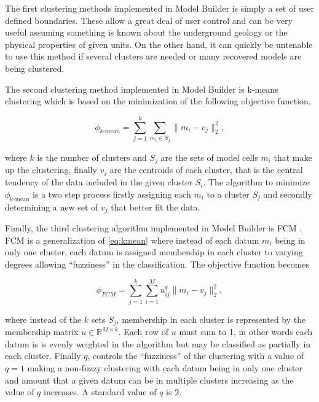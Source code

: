 The first clustering methods implemented in Model Builder is simply a set of user defined boundaries. These allow a great deal of user control and can be very useful assuming something is known about the underground geology or the physical properties of given units. On the other hand, it can quickly be untenable to use this method if several clusters are needed or many recovered models are being clustered.

The second clustering method implemented in Model Builder is k-means clustering \cite{gaf1984multivariate} which is based on the minimization of the following objective function,

\begin{equation}
 \phi_{k\text{-}mean} = \sum_{j=1}^k\sum_{m_i \in S_j}\|m_i - v_j\|_2^2, \label{eq:kmean}
\end{equation}


where $k$ is the number of clusters and $S_j$ are the sets of model cells $m_i$ that make up the clustering, finally $v_j$ are the centroids of each cluster, that is the central tendency of the data included in the given cluster $S_i$. The algorithm to minimize $\phi_{\text{k-mean}}$ is a two step process firstly assigning each $m_i$ to a cluster $S_j$ and secondly determining a new set of $v_j$ that better fit the data.

Finally, the third clustering algorithm implemented in Model Builder is \acf{FCM} \citep{sun2015multidomain}. \ac{FCM} is a generalization of \autoref{eq:kmean} where instead of each datum $m_i$ being in only one cluster, each datum is assigned membership in each cluster to varying degrees allowing ``fuzziness'' in the classification. The objective function becomes

\begin{equation}
 \phi_{FCM} = \sum_{j=1}^k\sum_{i = 1}^Mu^q_{ij}\|m_i - v_j\|_2^2,\label{eq:fcm}
\end{equation}

where instead of the $k$ sets $S_j$, membership in each cluster is represented by the membership matrix $u \in \mathbb R^{M\times k}$. Each row of $u$ must sum to 1, in other words each datum is is evenly weighted in the algorithm but may be classified as partially in each cluster. Finally $q$, controls the ``fuzziness'' of the clustering with a value of $q = 1$ making a non-fuzzy clustering with each datum being in only one cluster and amount that a given datum can be in multiple clusters increasing as the value of $q$ increases. A standard value of $q$ is 2.


